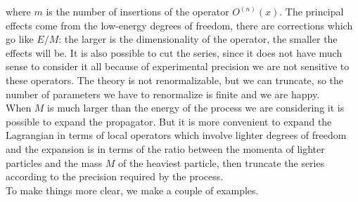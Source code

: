 \documentclass[../main.tex]{subfiles}
\begin{document}
where $m$ is the number of insertions of the operator $O^{(n)}(x)$. The principal effects come from the low-energy degrees of freedom, there are corrections which go like $E/M$: the larger is the dimensionality of the operator, the smaller the effects will be. It is also possible to cut the series, since it does not have much sense to consider it all because of experimental precision we are not sensitive to these operators. The theory is not renormalizable, but we can truncate, so the number of parameters we have to renormalize is finite and we are happy. \\
When $M$ is much larger than the energy of the process we are considering it is possible to expand the propagator. But it is more convenient to expand the Lagrangian in terms of local operators which involve lighter degrees of freedom and the expansion is in terms of the ratio between the momenta of lighter particles and the mass $M$ of the heaviest particle, then truncate the series according to the precision required by the process.\\
To make things more clear, we make a couple of examples.
\end{document}
